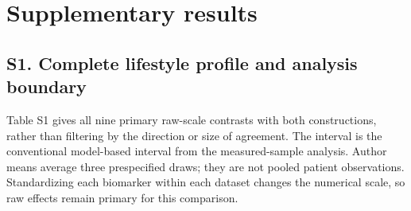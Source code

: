 \documentclass[11pt,letterpaper]{article}
\begin{document}
\endgroup

\clearpage

\appendix

\section*{Supplementary results}

\setcounter{figure}{0}

\renewcommand{\thefigure}{S\arabic{figure}}

\renewcommand{\theHfigure}{S\arabic{figure}}

\setcounter{table}{0}

\renewcommand{\thetable}{S\arabic{table}}

\renewcommand{\theHtable}{S\arabic{table}}

\FloatBarrier


\subsection*{S1. Complete lifestyle profile and analysis boundary}

Table S1 gives all nine primary raw-scale contrasts with both constructions, rather than filtering by the direction or size of agreement. The interval is the conventional model-based interval from the measured-sample analysis. Author means average three prespecified draws; they are not pooled patient observations. Standardizing each biomarker within each dataset changes the numerical scale, so raw effects remain primary for this comparison.


\FloatBarrier

\begingroup

\small

\renewcommand{\arraystretch}{1.22}
\end{document}
